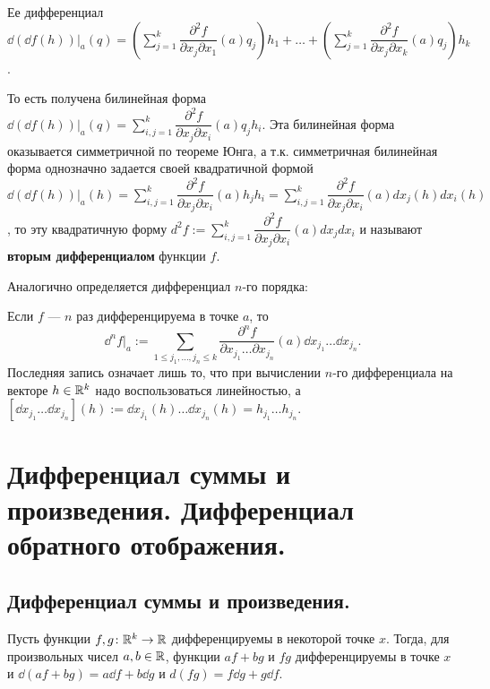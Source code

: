 \documentclass[a4paper]{article}
\theoremstyle{named}
\begin{document}
    Ее дифференциал
    $\dd(\dd f(h))\bigl|_a (q)=
    \left(\sum\limits_{j=1}^{k}\dfrac{\partial^2 f}{\partial x_j\partial x_1}(a)q_j\right)h_1+\ldots+
    \left(\sum\limits_{j=1}^{k}\dfrac{\partial^2 f}{\partial x_j\partial x_k}(a)q_j\right)h_k$.

    То есть получена билинейная форма
    $\dd(\dd f(h))\bigl|_a (q)=\sum\limits_{i,j=1}^{k}\dfrac{\partial^2 f}{\partial x_j\partial x_i}(a)q_jh_i$.
    Эта билинейная форма оказывается симметричной по теореме Юнга, а т.к. симметричная билинейная форма однозначно задается своей квадратичной формой
    $\dd(\dd f(h))\bigl|_a (h) = \sum\limits_{i,j=1}^{k}\dfrac{\partial^2 f}{\partial x_j\partial x_i}(a)h_jh_i
    =\sum\limits_{i,j=1}^{k}\dfrac{\partial^2 f}{\partial x_j\partial x_i}(a)dx_j(h)dx_i(h)$,
    то эту квадратичную форму $d^2f:=\sum\limits_{i,j=1}^{k}\dfrac{\partial^2 f}{\partial x_j\partial x_i}(a)dx_jdx_i$
    и называют {\bf вторым дифференциалом} функции $f$.

    Аналогично определяется дифференциал $n$-го порядка:

    \begin{definition*}
        Если $f$ --- $n$ раз дифференцируема в точке $a$, то
        $$
            \dd^nf\bigl|_a:=\sum\limits_{1 \leq j_1,\ldots, j_n \leq k}
            \dfrac{\partial^n f}{\partial x_{j_1}\ldots\partial x_{j_n}}(a)\dd x_{j_1}\ldots \dd x_{j_n}.
        $$
        Последняя запись означает лишь то, что при вычислении $n$-го дифференциала на векторе $h\in \mathbb{R}^k$
        надо воспользоваться линейностью, а $[\dd x_{j_1}\ldots \dd x_{j_n}] (h) := \dd x_{j_1}(h)\ldots \dd x_{j_n}(h) = h_{j_1}\ldots h_{j_n}$.
    \end{definition*}

    \section{Дифференциал суммы и произведения. Дифференциал обратного отображения.}

    \subsection{Дифференциал суммы и произведения.}

    \begin{theorem*}
        Пусть функции $f, g \colon \mathbb{R}^k\to \mathbb{R}$ дифференцируемы в некоторой точке $x$. Тогда, для произвольных чисел $a,b \in \mathbb{R}$,
        функции $af + bg$ и $fg$ дифференцируемы в точке $x$ и $\dd(af + bg) = a\dd f + b\dd g$ и $d(fg) = f\dd g + g\dd f$.
    \end{theorem*}
\end{document}
